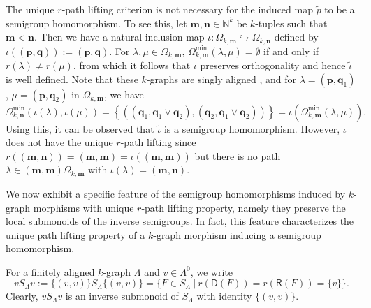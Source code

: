 \documentclass[a4paper,reqno,11pt]{amsart}
\numberwithin{equation}{section}
\theoremstyle{definition}
\theoremstyle{remark}
\newcommand{\N}{\mathbf{n}}
\newcommand{\M}{\mathbf{m}}
\newcommand{\bP}{\mathbf{p}}
\newcommand{\Q}{\mathbf{q}}
\begin{document}
The unique $r$-path lifting criterion is not necessary for the induced map $\tilde{p}$ to be a semigroup homomorphism. To see this, let $\M,\N\in \mathbb{N}^k$ be $k$-tuples such that $\M <\N$. Then we have a natural inclusion map $\iota:\Omega_{k,\M}\hookrightarrow \Omega_{k,\N}$ defined by $\iota((\bP,\Q)):=(\bP,\Q)$. For $\lambda,\mu\in \Omega_{k,\M}$, $\Omega_{k,\M}^{\min}(\lambda,\mu)=\emptyset$ if and only if $r(\lambda)\neq r(\mu)$, from which it follows that $\iota$ preserves orthogonality and hence $\tilde{\iota}$ is well defined. Note that these $k$-graphs are singly aligned \cite[Definition 20.1]{Exel}, and for $\lambda=(\bP,\Q_1)$, $\mu=(\bP,\Q_2)$ in $\Omega_{k,\M}$, we have \[\Omega_{k,\N}^{\min}(\iota(\lambda),\iota(\mu))=\left\{((\Q_1,\Q_1\vee \Q_2),(\Q_2,\Q_1\vee \Q_2))\right\}=\iota\left(\Omega_{k,\M}^{\min}(\lambda,\mu)\right).\] Using this, it can be observed that $\tilde{\iota}$ is a semigroup homomorphism. However, $\iota$ does not have the unique $r$-path lifting since $r((\M,\N))=(\M,\M)=\iota((\M,\M))$ but there is no path $\lambda\in (\M,\M)\Omega_{k,\M}$ with $\iota(\lambda)=(\M,\N)$. 

We now exhibit a specific feature of the semigroup homomorphisms induced by $k$-graph morphisms with unique $r$-path lifting property, namely they preserve the local submonoids of the inverse semigroups. In fact, this feature characterizes the unique path lifting property of a $k$-graph morphism inducing a semigroup homomorphism. 

For a finitely aligned $k$-graph $\Lambda$ and $v\in \Lambda^0$, we write \[vS_\Lambda v:=\{(v,v)\}S_\Lambda \{(v,v)\}=\{F\in S_\Lambda~|~r(\mathsf{D}(F))=r(\mathsf{R}(F))=\{v\}\}.\] Clearly, $vS_\Lambda v$ is an inverse submonoid of $S_\Lambda$ with identity $\{(v,v)\}$. 
\end{document}
